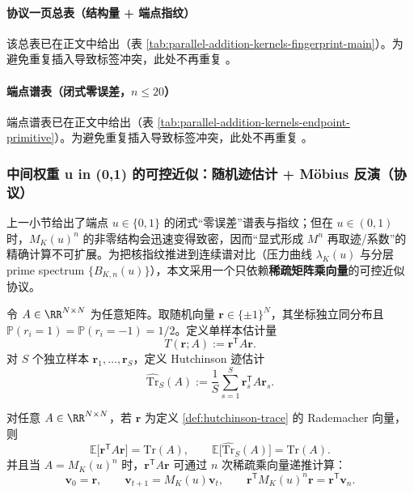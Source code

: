 \paragraph{协议一页总表（结构量 + 端点指纹）}
该总表已在正文中给出（表 \ref{tab:parallel-addition-kernels-fingerprint-main}）。为避免重复插入导致标签冲突，此处不再重复 \verb||。

\paragraph{端点谱表（闭式零误差，\texorpdfstring{$n\le 20$}{n<=20}）}
端点谱表已在正文中给出（表 \ref{tab:parallel-addition-kernels-endpoint-primitive}）。为避免重复插入导致标签冲突，此处不再重复 \verb||。

\subsubsection{中间权重 u in (0,1) 的可控近似：随机迹估计 + Möbius 反演（协议）}\label{app:kernel-fingerprint-hutchinson}
上一小节给出了端点 $u\in\{0,1\}$ 的闭式“零误差”谱表与指纹；但在 $u\in(0,1)$ 时，$M_K(u)^n$ 的非零结构会迅速变得致密，因而“显式形成 $M^n$ 再取迹/系数”的精确计算不可扩展。为把核指纹推进到连续谱对比（压力曲线 $\lambda_K(u)$ 与分层 prime spectrum $\{B_{K,n}(u)\}$），本文采用一个只依赖\textbf{稀疏矩阵乘向量}的可控近似协议。

\begin{definition}\label{def:hutchinson-trace}
令 $A\in\RR^{N\times N}$ 为任意矩阵。取随机向量 $\mathbf r\in\{\pm 1\}^N$，其坐标独立同分布且 $\mathbb{P}(r_i=1)=\mathbb{P}(r_i=-1)=1/2$。定义单样本估计量
\[
T(\mathbf r;A):=\mathbf r^{\mathsf T}A\mathbf r.
\]
对 $S$ 个独立样本 $\mathbf r_1,\dots,\mathbf r_S$，定义 Hutchinson 迹估计
\[
\widehat{\mathrm{Tr}}_S(A):=\frac{1}{S}\sum_{s=1}^{S}\mathbf r_s^{\mathsf T}A\mathbf r_s.
\]
\end{definition}

\begin{proposition}[无偏性与矩阵自由实现]\label{prop:hutchinson-unbiased-mfree}
对任意 $A\in\RR^{N\times N}$，若 $\mathbf r$ 为定义 \ref{def:hutchinson-trace} 的 Rademacher 向量，则
\[
\mathbb{E}\bigl[\mathbf r^{\mathsf T}A\mathbf r\bigr]=\mathrm{Tr}(A),
\qquad
\mathbb{E}\bigl[\widehat{\mathrm{Tr}}_S(A)\bigr]=\mathrm{Tr}(A).
\]
并且当 $A=M_K(u)^n$ 时，$\mathbf r^{\mathsf T}A\mathbf r$ 可通过 $n$ 次稀疏乘向量递推计算：
\[
\mathbf v_0=\mathbf r,\qquad \mathbf v_{t+1}=M_K(u)\mathbf v_t,\qquad
\mathbf r^{\mathsf T}M_K(u)^n\mathbf r=\mathbf r^{\mathsf T}\mathbf v_n.
\]
\end{proposition}

